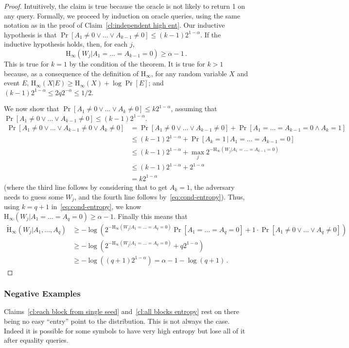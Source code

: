 \documentclass[11pt]{article}
\newcommand{\clref}[1]{\mbox{Claim~\ref{#1}}}
\newcommand{\Hoo}{\mathrm{H}_\infty}
\newcommand{\Hav}{\tilde{\mathrm{H}}_\infty}
\begin{document}
\begin{proof}
Intuitively, the claim is true because the oracle is not likely to return 1 on any query. Formally, we proceed by induction on oracle queries,
using the same notation as in the proof of   \clref{cl:independent high ent}. Our inductive hypothesis is
that $\Pr[A_1\neq 0 \vee \dots \vee A_{k-1}\neq 0] \leq (k-1)2^{1-\alpha}$.  If the inductive hypothesis holds, then, for each $j$,
\begin{equation}
\label{eq:cond-entropy}
\Hoo(W_j | A_1= \dots= A_{k-1}=0) \ge \alpha-1\,.
\end{equation}
This is true for $k=1$ by the condition of the theorem. It is true for $k>1$ because, as a consequence of the definition of $\Hoo$,
for any random variable $X$ and event $E$, $\Hoo(X|E)\ge \Hoo(X)+\log\Pr[E]$; and $(k-1) 2^{1-\alpha}\leq 2 q 2^{-\alpha} \leq 1/2$.

We now show that $\Pr[A_1\neq 0 \vee \dots \vee A_{k}\neq 0] \leq k 2^{1-\alpha}$, assuming that $\Pr[A_1\neq 0 \vee \dots \vee A_{k-1}\neq 0] \leq (k-1)2^{1-\alpha}$.
\begin{align*}
\Pr[A_1\neq 0 \vee \dots \vee A_{k-1}\neq 0 \vee A_k\neq 0] & =
\Pr[A_1\neq 0 \vee \dots \vee A_{k-1}\neq 0]+\Pr[A_1=\dots = A_{k-1}=0 \wedge A_k=1]\\
& \le  (k-1)2^{1-\alpha}+\Pr[A_k=1\,|\,A_1=\dots = A_{k-1}=0]\\
& \le  (k-1)2^{1-\alpha}+\max_j 2^{-\Hoo(W_j | A_1=\dots =A_{k-1}=0)}\\
& \le  (k-1)2^{1-\alpha}+ 2^{1-\alpha}\\
& = k 2^{1-\alpha}
\end{align*}
(where the third line follows by considering that to get $A_k=1$, the adversary needs to guess some $W_j$, and the fourth line follows by~\eqref{eq:cond-entropy}).
Thus, using $k=q+1$ in~\eqref{eq:cond-entropy},
 we know $\Hoo(W_j | A_1= \dots= A_q=0) \ge \alpha-1$.  Finally this means that
\begin{align*}
\Hav(W_j | A_1,\dots, A_q) &\ge -\log \left( 2^{-\Hoo(W_j | A_1= \dots= A_q=0)}\Pr[A_1=\dots=A_q=0]+1\cdot \Pr[A_1\neq 0 \vee \dots \vee  A_q\neq 0] \right)\\
& \ge -\log \left(  2^{-\Hoo(W_j | A_1= \dots= A_q=0)}+q2^{1-\alpha} \right)\\
& \ge -\log \left(  (q+1) 2^{1-\alpha}\right) = \alpha-1-\log(q+1)\,.
\end{align*}
\end{proof}

\subsubsection{Negative Examples}
\label{sec:negative ex}
Claims~\ref{cl:each block from single seed} and~\ref{cl:all blocks entropy} rest on there being no easy ``entry'' point to the distribution.  This is not always the case.  Indeed it is possible for some symbols to have very high entropy but lose all of it after equality queries.
\end{document}
